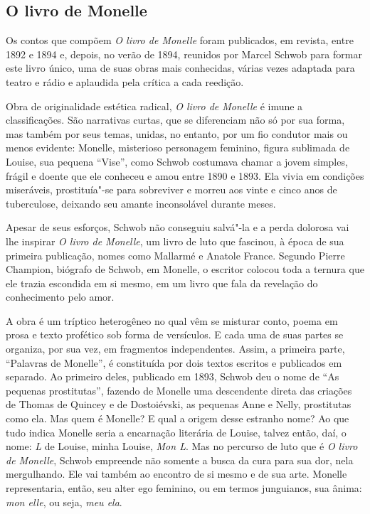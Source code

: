 \subsection{O livro de Monelle}

Os contos que compõem \textit{O livro de Monelle} foram publicados,
em revista, entre 1892 e 1894 e, depois, no verão de 1894, reunidos por Marcel
Schwob para formar este livro único, uma de suas obras mais conhecidas, várias
vezes adaptada para teatro e rádio e aplaudida pela crítica a cada reedição.

Obra de originalidade estética radical, \textit{O livro de Monelle} é imune
a classificações. São narrativas curtas, que se diferenciam não só por sua
forma, mas também por seus temas, unidas, no entanto, por um fio condutor
mais ou menos evidente: Monelle, misterioso personagem feminino, figura
sublimada de Louise, sua pequena “Vise”, como Schwob costumava chamar a
jovem simples, frágil e doente que ele conheceu e amou entre 1890 e 1893. Ela
vivia em condições miseráveis, prostituía"-se para sobreviver e morreu aos vinte
e cinco anos de tuberculose, deixando seu amante inconsolável durante meses.

Apesar de seus esforços, Schwob não conseguiu salvá"-la e a perda dolorosa
vai lhe inspirar \textit{O livro de Monelle}, um livro de luto que fascinou, à
época de sua primeira publicação, nomes como Mallarmé e Anatole France.
Segundo Pierre Champion, biógrafo de Schwob, em Monelle, o escritor colocou
toda a ternura que ele trazia escondida em si mesmo, em um livro que fala da
revelação do conhecimento pelo amor.

A obra é um tríptico heterogêneo no qual vêm se misturar conto, poema em
prosa e texto profético sob forma de versículos. E cada uma de suas partes se
organiza, por sua vez, em fragmentos independentes. Assim, a primeira parte,
``Palavras de Monelle'', é constituída por dois textos escritos e
publicados em separado. Ao primeiro deles, publicado em 1893, Schwob deu o nome
de ``As pequenas prostitutas'', fazendo de Monelle uma descendente direta
das criações de Thomas de Quincey e de Dostoiévski, as pequenas Anne e Nelly,
prostitutas como ela. Mas quem é Monelle? E qual a origem desse estranho nome?
Ao que tudo indica Monelle seria a encarnação literária de Louise, talvez então, daí,
o nome: \textit{L} de Louise, minha Louise, \textit{Mon L}. Mas no percurso de luto
que é \textit{O livro de Monelle}, Schwob empreende não somente a busca da cura para
sua dor, nela mergulhando. Ele vai também ao encontro de si mesmo e de sua arte.
Monelle representaria, então, seu alter ego feminino, ou em termos junguianos,
sua ânima: \textit{mon elle}, ou seja, \textit{meu ela}.

